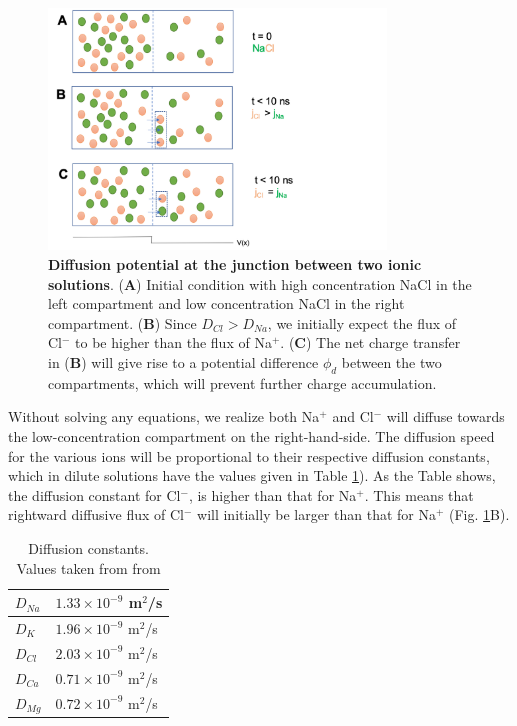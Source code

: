\begin{figure}[!ht]
\begin{center}
\includegraphics[width=0.8\textwidth]{Figures/Eldiff/Diffusionpot.png}
\end{center}
\caption{\textbf{Diffusion potential at the junction between two ionic solutions}. ({\bf A}) Initial condition with high concentration NaCl in the left compartment and low concentration NaCl in the right compartment. ({\bf B}) Since $D_{Cl} > D_{Na}$, we initially expect the flux of Cl$^-$ to be higher than the flux of Na$^+$. ({\bf C}) The net charge transfer in ({\bf B}) will give rise to a potential difference $\phi_d$ between the two compartments, which will prevent further charge accumulation. }
\label{Eldiff:fig:diffpot}
\end{figure}

Without solving any equations, we realize both Na$^+$ and Cl$^-$ will diffuse towards the low-concentration compartment on the right-hand-side. The diffusion speed for the various ions will be proportional to their respective diffusion constants, which in dilute solutions have the values given in Table \ref{tab:diffconsts}). As the Table shows, the diffusion constant for Cl$^-$, is higher than that for Na$^+$. This means that rightward diffusive flux of Cl$^-$ will initially be larger than that for Na$^+$  (Fig. \ref{Eldiff:fig:diffpot}B). 

\begin{table}[h!]
\begin{center}
\caption{Diffusion constants. Values taken from from \cite{Bowen2002, Lyshevski2007}}
\label{tab:diffconsts}
    \begin{tabular}{l|l}
    \hline
    $D_{Na}$ & $1.33\times 10^{-9}$ m$^2$/s\\ \hline
    $D_K$ & $1.96  \times 10^{-9}$ m$^2$/s \\ \hline
    $D_{Cl}$ & $2.03 \times 10^{-9}$ m$^2$/s \\ \hline
    $D_{Ca}$ & $0.71\times 10^{-9}$ m$^2$/s \\ \hline
    $D_{Mg}$ & $0.72\times 10^{-9}$ m$^2$/s \\ \hline    
    \end{tabular}
\end{center}
\end{table}


